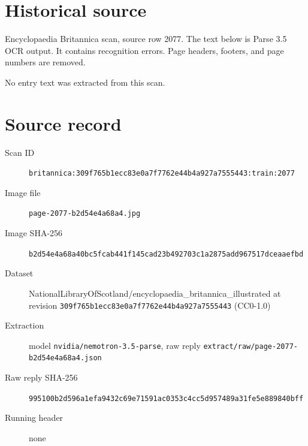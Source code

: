 \documentclass{article}
\begin{document}
\section*{Historical source}
Encyclopaedia Britannica scan, source row 2077. The text below is Parse 3.5 OCR output. It contains recognition errors.
Page headers, footers, and page numbers are removed.

No entry text was extracted from this scan.

\section*{Source record}
\begin{description}
\item[Scan ID] \texttt{britannica:309f765b1ecc83e0a7f7762e44b4a927a7555443:train:2077}
\item[Image file] \texttt{page-2077-b2d54e4a68a4.jpg}
\item[Image SHA-256] \texttt{b2d54e4a68a40bc5fcab441f145cad23b492703c1a2875add967517dceaaefbd}
\item[Dataset] NationalLibraryOfScotland/encyclopaedia\_britannica\_illustrated at revision \texttt{309f765b1ecc83e0a7f7762e44b4a927a7555443} (CC0-1.0)
\item[Extraction] model \texttt{nvidia/nemotron-3.5-parse}, raw reply \texttt{extract/raw/page-2077-b2d54e4a68a4.json}
\item[Raw reply SHA-256] \texttt{995100b2d596a1efa9432c69e71591ac0353c4cc5d957489a31fe5e889840bff}

\item[Running header] none
\end{description}
\end{document}
